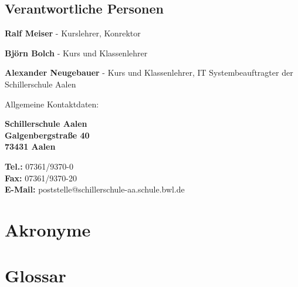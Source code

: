 \documentclass[12pt, twoside, a4paper, ngerman]{article}
\begin{document}
\begin{appendix}
\subsection{Verantwortliche Personen}\label{subsec:Verantwortliche Personen}

\textbf{Ralf Meiser} - Kurslehrer, Konrektor

\textbf{Björn Bolch} - Kurs und Klassenlehrer

\textbf{Alexander Neugebauer} - Kurs und Klassenlehrer, IT Systembeauftragter der Schillerschule Aalen

Allgemeine Kontaktdaten:

\textbf{Schillerschule Aalen}\\
\textbf{Galgenbergstraße 40}\\
\textbf{73431 Aalen}

\textbf{Tel.:} 07361/9370-0\\
\textbf{Fax:} 07361/9370-20\\
\textbf{E-Mail:} poststelle@schillerschule-aa.schule.bwl.de


\newpage
\section{Akronyme}



\newpage
\section{Glossar}
\label{anhang:Glossar}
\printglossary[title={}] 

\end{appendix}

\newpage
{}
\listoffigures
\cleardoublepage

\newpage
{}
\listoftables
\cleardoublepage

\newpage
{}
\lstlistoflistings
\cleardoublepage

\newpage
{}
	  


\end{document}
